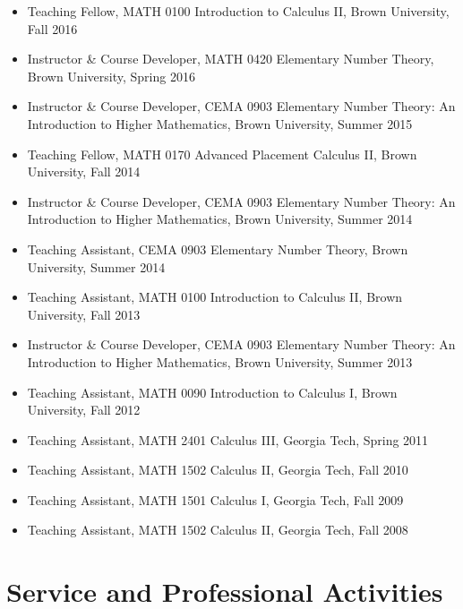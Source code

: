 \begin{itemize}

  \item Teaching Fellow,
    MATH 0100 Introduction to Calculus II, Brown University, Fall 2016
  \item Instructor \& Course Developer,
    MATH 0420 Elementary Number Theory, Brown University, Spring 2016
  \item Instructor \& Course Developer,
    CEMA 0903 Elementary Number Theory: An Introduction to Higher Mathematics,
    Brown University, Summer 2015
  \item Teaching Fellow,
    MATH 0170 Advanced Placement Calculus II, Brown University, Fall 2014
  \item Instructor \& Course Developer,
    CEMA 0903 Elementary Number Theory: An Introduction to Higher Mathematics,
    Brown University, Summer 2014
  \item Teaching Assistant,
    CEMA 0903 Elementary Number Theory, Brown University, Summer 2014
  \item Teaching Assistant,
    MATH 0100 Introduction to Calculus II, Brown University, Fall 2013
  \item Instructor \& Course Developer,
    CEMA 0903 Elementary Number Theory: An Introduction to Higher Mathematics,
    Brown University, Summer 2013
  \item Teaching Assistant,
    MATH 0090 Introduction to Calculus I, Brown University, Fall 2012
  \item Teaching Assistant,
    MATH 2401 Calculus III, Georgia Tech, Spring 2011
  \item Teaching Assistant,
    MATH 1502 Calculus II, Georgia Tech, Fall 2010
  \item Teaching Assistant,
    MATH 1501 Calculus I, Georgia Tech, Fall 2009
  \item Teaching Assistant,
    MATH 1502 Calculus II, Georgia Tech, Fall 2008

\end{itemize}


\section*{Service and Professional Activities}

